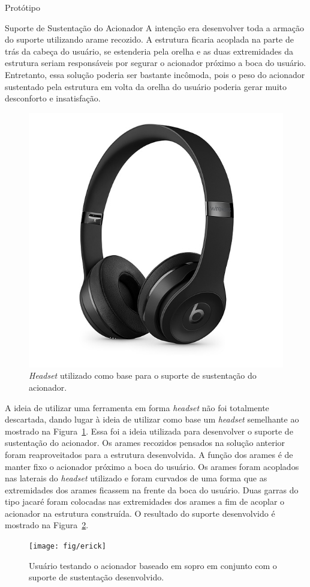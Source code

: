 \begin{chapter}{Protótipo}
\begin{section}{Suporte de Sustentação do Acionador}
A intenção era desenvolver toda a armação do suporte utilizando arame recozido.
A estrutura ficaria acoplada na parte de trás da cabeça do usuário, se estenderia
pela orelha e as duas extremidades da estrutura seriam responsáveis por segurar
o acionador próximo a boca do usuário. Entretanto, essa solução poderia ser
bastante incômoda, pois o peso do acionador sustentado pela estrutura em volta
da orelha do usuário poderia gerar muito desconforto e insatisfação.

 
\begin{figure}[!h]
	\centering
	\begin{minipage}[c]{\textwidth}
	\centering
	\includegraphics[width=0.35\linewidth]{fig/fone}
	\caption{\textit{Headset} utilizado como base para o suporte de sustentação
do acionador.}
	\label{fig:fone}
	\end{minipage}
\end{figure}


A ideia de utilizar uma ferramenta em forma \textit{headset} não foi totalmente
descartada, dando lugar à ideia de utilizar como base um \textit{headset}
semelhante ao mostrado na Figura~\ref{fig:fone}. 
Essa foi a ideia utilizada para desenvolver o suporte de sustentação do
acionador. Os arames recozidos pensados na solução anterior foram reaproveitados
para a estrutura desenvolvida. A função dos arames é de manter fixo o acionador
próximo a boca do usuário. Os arames foram acoplados nas laterais do
\textit{headset} utilizado e foram curvados de uma forma que as extremidades
dos arames ficassem na frente da boca do usuário. Duas garras do tipo jacaré
foram colocadas nas extremidades  dos arames a fim de acoplar o acionador na
estrutura construída. O resultado do suporte desenvolvido é mostrado na
Figura~\ref{fig:suporte}. 

\begin{figure}[!h]
	\centering
	\begin{minipage}[c]{\textwidth}
	\centering
	\texttt{[image: fig/erick]}
	\caption{Usuário testando o acionador baseado em sopro em conjunto com o
suporte de sustentação desenvolvido.} %
	\label{fig:suporte}
	\end{minipage}
\end{figure}


\end{section}
\end{chapter}
